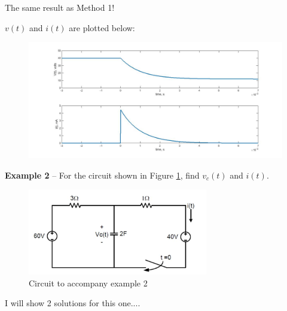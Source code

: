 \documentclass{handout}
\begin{document}
{The same result as Method 1!

$v(t)$ and $i(t)$ are plotted below:

\begin{figure} [h!]
\centering
\includegraphics[width=1\textwidth]{Example1_plots.jpg}
\end{figure} 
}


\newpage
\clearpage
\pagebreak

\textbf{Example 2}  -- For the circuit shown in Figure \ref{fig: Example2}, find $v_c(t)$ and $i(t)$.  

\begin{figure} [h!]
\centering
\includegraphics[width=0.7\textwidth]{Example2.jpg}
\caption{Circuit to accompany example 2}
\label{fig: Example2}
\end{figure}

I will show 2 solutions for this one....
\end{document}
